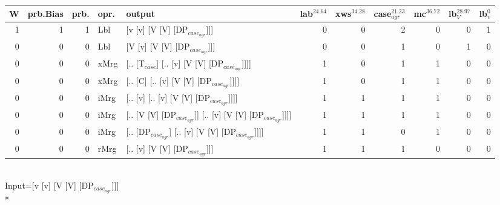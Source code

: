 \begin{tabularx}{\linewidth}{rrrlXrrrrrr}
\hline
   W &   prb.Bias &   prb. & opr.   & output                                                    &   lab$^{24.64}$ &   xws$^{34.28}$ &   case$_{agr}^{21.23}$ &   mc$^{36.72}$ &   lb$_{V}^{28.97}$ &   lb$_{v}^{0}$ \\
\hline
   1 &       1 &   1 & Lbl  & [v [v] [V [V] [DP$_{case_{agr}}$]]]                             &             0 &             0 &                  2 &            0 &              0 &             1 \\
   0 &       0 &   0 & Lbl  & [V [v] [V [V] [DP$_{case_{agr}}$]]]                             &             0 &             0 &                  1 &            0 &              1 &             0 \\
   0 &       0 &   0 & xMrg & [.. [T$_{case}$] [.. [v] [V [V] [DP$_{case_{agr}}$]]]]              &             1 &             0 &                  1 &            1 &              0 &             0 \\
   0 &       0 &   0 & xMrg & [.. [C] [.. [v] [V [V] [DP$_{case_{agr}}$]]]]                   &             1 &             0 &                  1 &            1 &              0 &             0 \\
   0 &       0 &   0 & iMrg & [.. [v] [.. [v] [V [V] [DP$_{case_{agr}}$]]]]                   &             1 &             1 &                  1 &            1 &              0 &             0 \\
   0 &       0 &   0 & iMrg & [.. [V [V] [DP$_{case_{agr}}$]] [.. [v] [V [V] [DP$_{case_{agr}}$]]]] &             1 &             1 &                  1 &            1 &              0 &             0 \\
   0 &       0 &   0 & iMrg & [.. [DP$_{case_{agr}}$] [.. [v] [V [V] [DP$_{case_{agr}}$]]]]         &             1 &             1 &                  0 &            1 &              0 &             0 \\
   0 &       0 &   0 & rMrg & [.. [v] [V [V] [DP$_{case_{agr}}$]]]                            &             1 &             1 &                  1 &            0 &              0 &             0 \\
\hline
\end{tabularx}\endgroup\\
\begingroup\scriptsize Input=[v [v] [V [V] [DP$_{case_{agr}}$]]]\\*

